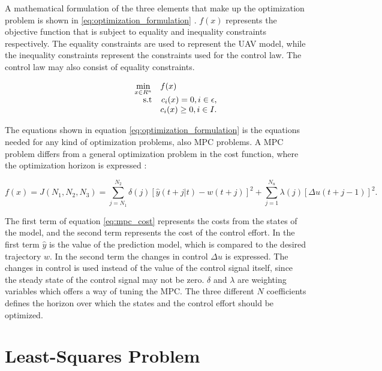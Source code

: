 A mathematical formulation of the three elements that make up the optimization problem is shown in \ref{eq:optimization_formulation} \cite{nocedalOPTIMIZATION}. $f(x)$ represents the objective function that is subject to equality and inequality constraints respectively. The equality constraints are used to represent the UAV model, while the inequality constraints represent the constraints used for the control law. The control law may also consist of equality constraints.

\begin{equation}
	\label{eq:optimization_formulation}
	\begin{array}{rrclcl}
		\displaystyle \min_{x \in R^n} & \multicolumn{3}{l}{f(x)} \\
		\textrm{s.t}
		& c_i(x) = 0, i \in \epsilon, \\
		& c_i(x) \geq 0, i \in I.
	\end{array}
\end{equation}

The equations shown in equation \ref{eq:optimization_formulation} is the equations needed for any kind of optimization problems, also MPC problems. A MPC problem differs from a general optimization problem in the cost function, where the optimization horizon is expressed \cite{mpcCAMACHO}:

\begin{equation}
	\label{eq:mpc_cost}
	f(x) = J(N_1, N_2, N_3) = \sum_{j=N_1}^{N_2} \delta(j)[\hat{y}(t+j|t)-w(t+j)]^2 + 
	\sum_{j=1}^{N_u}\lambda(j)[\Delta u(t+j-1)]^2.
\end{equation}

The first term of equation \ref{eq:mpc_cost} represents the costs from the states of the model, and the second term represents the cost of the control effort. In the first term $\hat{y}$ is the value of the prediction model, which is compared to the desired trajectory $w$. In the second term the changes in control $\Delta u$ is expressed. The changes in control is used instead of the value of the control signal itself, since the steady state of the control signal may not be zero. $\delta$ and $\lambda$ are weighting variables which offers a way of tuning the MPC. The three different $N$ coefficients defines the horizon over which the states and the control effort should be optimized.


\section{Least-Squares Problem}

